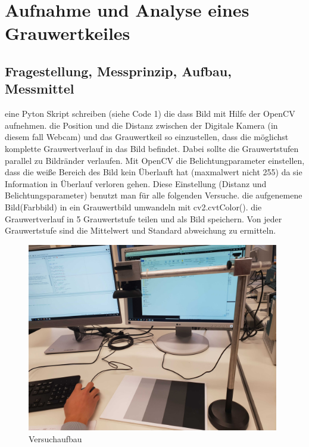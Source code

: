\documentclass[12pt, oneside, a4paper, \docLanguage]{report}
\begin{document}

\setcounter{section}{0}



\clearpage

%
%


%
%


%
%


%
%




\setcounter{page}{1} 
\pagestyle{default}

%
%
\chapter{Aufnahme und Analyse eines Grauwertkeiles}
\label{chap:VERSUCH_1}

\section{Fragestellung, Messprinzip, Aufbau, Messmittel}
\label{chap:VERSUCH_1_FRAGESTELLUNG}
eine Pyton Skript schreiben (siehe Code 1) die dass Bild mit Hilfe der OpenCV aufnehmen. 
die Position und die Distanz zwischen der Digitale Kamera (in diesem fall Webcam) und das Grauwertkeil so einzustellen, dass die möglichst komplette Grauwertverlauf in das Bild befindet. Dabei sollte die Grauwertstufen parallel zu Bildränder verlaufen.
Mit OpenCV die Belichtungparameter einstellen, dass die weiße Bereich des Bild kein Überlauft hat (maxmalwert nicht 255) da sie Information in Überlauf verloren gehen. Diese Einstellung (Distanz und Belichtungsparameter) benutzt man für alle folgenden Versuche. die aufgenemene Bild(Farbbild) in ein Grauwertbild umwandeln mit cv2.cvtColor(). 
die Grauwertverlauf in 5 Grauwertstufe teilen und als Bild speichern. Von jeder Grauwertstufe sind die Mittelwert und Standard abweichung zu ermitteln.
\begin{figure}[H]
	\centering\small
	\includegraphics[width=11cm]{versuch_aufbau.jpg}
	\caption{Versuchaufbau}
\end{figure}
\end{document}
